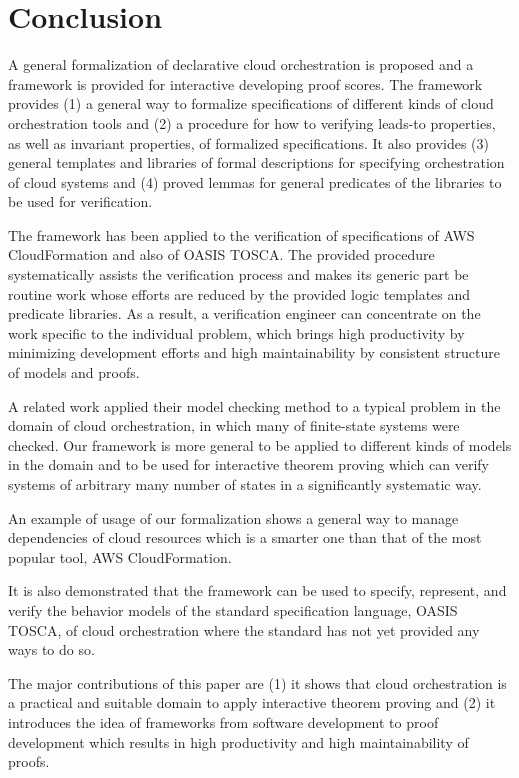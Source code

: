 \documentclass[12pt]{report}
\begin{document}
\section{Conclusion}
A general formalization of declarative cloud orchestration is proposed
and a framework is provided for interactive developing proof
scores. The framework provides (1) a general way to formalize
specifications of different kinds of cloud orchestration tools and (2)
a procedure for how to verifying leads-to properties, as well as
invariant properties, of formalized specifications.  It also provides
(3) general templates and libraries of formal descriptions for
specifying orchestration of cloud systems and (4) proved lemmas for
general predicates of the libraries to be used for verification.

The framework has been applied to the verification of specifications
of AWS CloudFormation and also of OASIS TOSCA. The provided procedure
systematically assists the verification process and makes its generic
part be routine work whose efforts are reduced by the provided logic
templates and predicate libraries. As a result, a verification
engineer can concentrate on the work specific to the individual
problem, which brings high productivity by minimizing development
efforts and high maintainability by consistent structure of models and
proofs.

A related work applied their model checking method to a typical
problem in the domain of cloud orchestration, in which many of
finite-state systems were checked. Our framework is more general to be
applied to different kinds of models in the domain and to be used for
interactive theorem proving which can verify systems of arbitrary many
number of states in a significantly systematic way.

An example of usage of our formalization shows a general way to manage
dependencies of cloud resources which is a smarter one than that of
the most popular tool, AWS CloudFormation.

It is also demonstrated that the framework can be used to specify,
represent, and verify the behavior models of the standard
specification language, OASIS TOSCA, of cloud orchestration where the
standard has not yet provided any ways to do so.

The major contributions of this paper are (1) it shows that cloud
orchestration is a practical and suitable domain to apply interactive
theorem proving and (2) it introduces the idea of frameworks from
software development to proof development which results in high
productivity and high maintainability of proofs.
\end{document}
